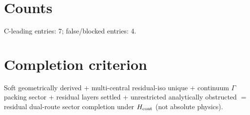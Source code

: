 \documentclass[11pt,a4paper]{article}
\begin{document}
\section{Counts}

C-leading entries: 7; false/blocked entries: 4.

\section{Completion criterion}
Soft geometrically derived + multi-central residual-iso unique + continuum $\Gamma$ packing sector + residual layers settled + unrestricted analytically obstructed $=$ residual dual-route sector completion under $H_{\rm cont}$ (not absolute physics).
\end{document}
